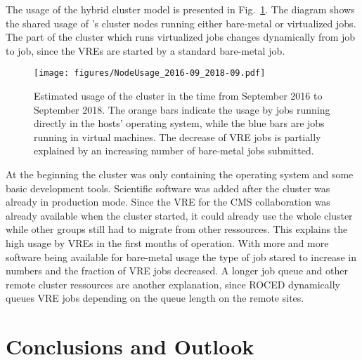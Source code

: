 The usage of the hybrid cluster model is presented in Fig.~\ref{fig-nodeusage}.
The diagram shows the shared usage of \NEMO's cluster nodes running either
bare-metal or virtualized jobs. The part of the cluster which runs virtualized
jobs changes dynamically from job to job, since the VREs are started by
a standard bare-metal job.

\begin{figure}[ht]
\centering
  \texttt{[image: figures/NodeUsage\_2016-09\_2018-09.pdf]}
  \caption{Estimated usage of the \NEMO cluster in the time from September 2016
    to September 2018. The orange bars indicate the usage by jobs
    running directly in the hosts' operating system, while the blue bars are jobs
    running in virtual machines. The decrease of VRE jobs is partially explained
    by an increasing number of bare-metal jobs submitted.}
  \label{fig-nodeusage}
\end{figure}

At the beginning the cluster was only containing the operating system and some
basic development tools. Scientific software was added after the cluster was
already in production mode. Since the VRE for the CMS collaboration was already
available when the \NEMO cluster started, it could already use the whole cluster
while other groups still had to migrate from other ressources. This explains the
high usage by VREs in the first months of
operation. With more and more software being available for bare-metal usage the
type of job stared to increase in numbers and the fraction of VRE
jobs decreased. A longer job queue and other remote cluster ressources are
another explanation, since ROCED dynamically queues VRE jobs depending on the
queue length on the remote sites.




\section{Conclusions and Outlook}


